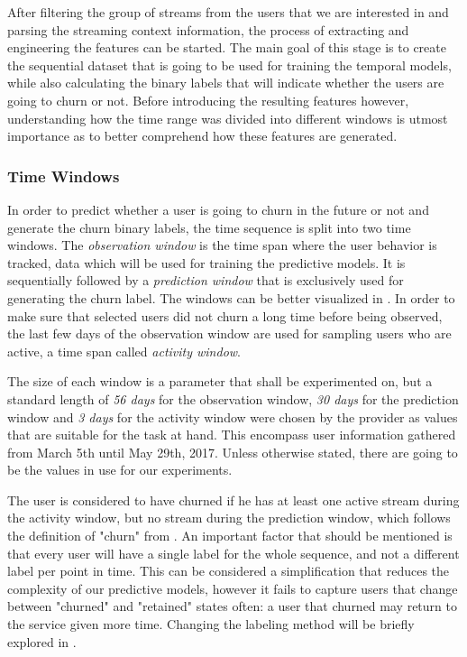 \documentclass{kththesis}
\begin{document}
After filtering the group of streams from the users that we are interested in and parsing the streaming context information, the process of extracting and engineering the features can be started. The main goal of this stage is to create the sequential dataset that is going to be used for training the temporal models, while also calculating the binary labels that will indicate whether the users are going to churn or not. Before introducing the resulting features however, understanding how the time range was divided into different windows is utmost importance as to better comprehend how these features are generated.

\subsubsection{Time Windows}

In order to predict whether a user is going to churn in the future or not and generate the churn binary labels, the time sequence is split into two time windows. The \emph{observation window} is the time span where the user behavior is tracked, data which will be used for training the predictive models. It is sequentially followed by a \emph{prediction window} that is exclusively used for generating the churn label. The windows can be better visualized in . In order to make sure that selected users did not churn a long time before being observed, the last few days of the observation window are used for sampling users who are active, a time span called \emph{activity window}. 

The size of each window is a parameter that shall be experimented on, but a standard length of \emph{56 days} for the observation window, \emph{30 days} for the prediction window and \emph{3 days} for the activity window were chosen by the provider as values that are suitable for the task at hand. This encompass user information gathered from March 5th until May 29th, 2017. Unless otherwise stated, there are going to be the values in use for our experiments.

The user is considered to have churned if he has at least one active stream during the activity window, but no stream during the prediction window, which follows the definition of "churn" from . An important factor that should be mentioned is that every user will have a single label for the whole sequence, and not a different label per point in time. This can be considered a simplification that reduces the complexity of our predictive models, however it fails to capture users that change between "churned" and "retained" states often: a user that churned may return to the service given more time. Changing the labeling method will be briefly explored in .
\end{document}
